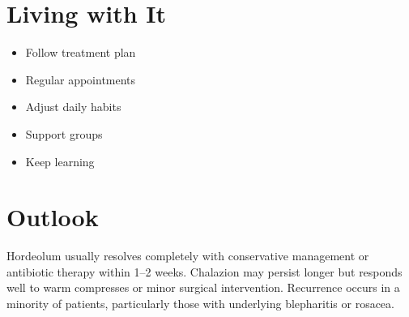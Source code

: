 \section{Living with It}
\begin{itemize}[noitemsep]
  \item Follow treatment plan
  \item Regular appointments
  \item Adjust daily habits
  \item Support groups
  \item Keep learning
\end{itemize}

\section{Outlook}
Hordeolum usually resolves completely with conservative management or antibiotic therapy within 1--2 weeks. Chalazion may persist longer but responds well to warm compresses or minor surgical intervention. Recurrence occurs in a minority of patients, particularly those with underlying blepharitis or rosacea.
